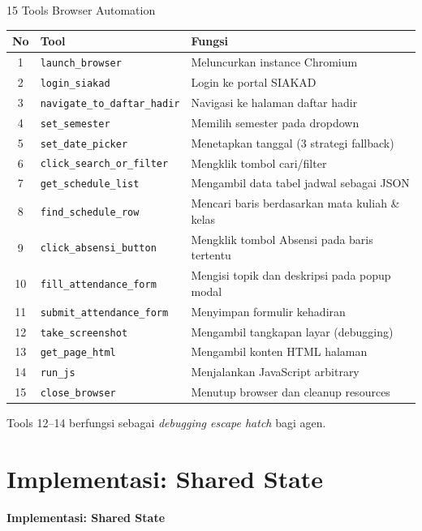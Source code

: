 \documentclass[aspectratio=169, table]{beamer}
\begin{document}
\begin{frame}{15 Tools Browser Automation}
\vspace{20pt}
\centering
\scriptsize
\renewcommand{\arraystretch}{0.92}
\begin{tabular}{|c|l|p{7.5cm}|}
\hline
\rowcolor{blue!12}
\textbf{No} & \textbf{Tool} & \textbf{Fungsi} \\
\hline
1 & \texttt{launch\_browser} & Meluncurkan instance Chromium \\
\hline
2 & \texttt{login\_siakad} & Login ke portal SIAKAD \\
\hline
3 & \texttt{navigate\_to\_daftar\_hadir} & Navigasi ke halaman daftar hadir \\
\hline
4 & \texttt{set\_semester} & Memilih semester pada dropdown \\
\hline
5 & \texttt{set\_date\_picker} & Menetapkan tanggal (3 strategi fallback) \\
\hline
6 & \texttt{click\_search\_or\_filter} & Mengklik tombol cari/filter \\
\hline
7 & \texttt{get\_schedule\_list} & Mengambil data tabel jadwal sebagai JSON \\
\hline
8 & \texttt{find\_schedule\_row} & Mencari baris berdasarkan mata kuliah \& kelas \\
\hline
9 & \texttt{click\_absensi\_button} & Mengklik tombol Absensi pada baris tertentu \\
\hline
10 & \texttt{fill\_attendance\_form} & Mengisi topik dan deskripsi pada popup modal \\
\hline
11 & \texttt{submit\_attendance\_form} & Menyimpan formulir kehadiran \\
\hline
12 & \texttt{take\_screenshot} & Mengambil tangkapan layar (debugging) \\
\hline
13 & \texttt{get\_page\_html} & Mengambil konten HTML halaman \\
\hline
14 & \texttt{run\_js} & Menjalankan JavaScript arbitrary \\
\hline
15 & \texttt{close\_browser} & Menutup browser dan cleanup resources \\
\hline
\end{tabular}

\vspace{4pt}
\small
Tools 12--14 berfungsi sebagai \textit{debugging escape hatch} bagi agen.
\end{frame}

\section{Implementasi: Shared State}
\begin{frame}{\hfill}
	\centering
	\Huge{\textbf{Implementasi: Shared State}}
\end{frame}
\end{document}
